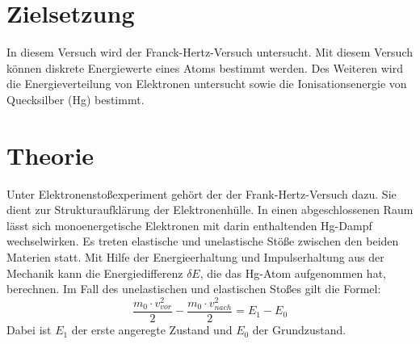 \section{Zielsetzung}
In diesem Versuch wird der Franck-Hertz-Versuch untersucht.
Mit diesem Versuch können diskrete Energiewerte eines Atoms bestimmt werden. Des Weiteren wird
die Energieverteilung von Elektronen untersucht sowie die Ionisationsenergie von Quecksilber (Hg) bestimmt.
\section{Theorie}
Unter Elektronenstoßexperiment gehört der der Frank-Hertz-Versuch dazu. Sie dient zur Strukturaufklärung
der Elektronenhülle.
In einen abgeschlossenen Raum lässt sich monoenergetische Elektronen mit darin enthaltenden Hg-Dampf wechselwirken.
Es treten elastische und unelastische Stöße zwischen den beiden Materien statt.
Mit Hilfe der Energieerhaltung und Impulserhaltung aus der Mechanik kann die Energiedifferenz $\delta E$,
die das Hg-Atom aufgenommen hat, berechnen.
Im Fall des unelastischen und elastischen Stoßes gilt die Formel:
\begin{equation}
  \frac{m_0 \cdot v_{vor}^2}{2} - \frac{m_0 \cdot v_{nach}^2}{2} = E_1 - E_0
\label{eq:1}
\end{equation}
Dabei ist $E_1$ der erste angeregte Zustand und $E_0$ der Grundzustand.
